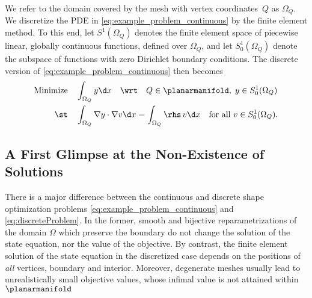 We refer to the domain covered by the mesh with vertex coordinates~$Q$ as $\Omega_Q$.
We discretize the PDE in \eqref{eq:example_problem_continuous} by the finite element method.
To this end, let $S^1(\Omega_Q)$ denotes the finite element space of piecewise linear, globally continuous functions, defined over $\Omega_Q$, and let $S^1_0(\Omega_Q)$ denote the subspace of functions with zero Dirichlet boundary conditions.
The discrete version of \eqref{eq:example_problem_continuous} then becomes
\begin{equation}
	\label{eq:discreteProblem}
	\begin{aligned}
		\text{Minimize}
		&
		\quad
		\int_{\Omega_Q} y \d x
		\quad
		\text{\wrt}
		\quad
		Q \in \planarmanifold
		,
		\;
		y \in S^1_0(\Omega_Q)
		\\
		\text{\st}
		&
		\quad
		\int_{\Omega_Q} \nabla y \cdot \nabla v \d x
		=
		\int_{\Omega_Q} \rhs \, v \d x
		\quad
		\text{for all }
		v \in S^1_0(\Omega_Q)
		.
	\end{aligned}
\end{equation}


\subsection{A First Glimpse at the Non-Existence of Solutions}
\label{subsection:first_glimpse_non-existence}

There is a major difference between the continuous and discrete shape optimization problems \eqref{eq:example_problem_continuous} and \eqref{eq:discreteProblem}.
In the former, smooth and bijective re\-pa\-ra\-metri\-za\-tions of the domain $\Omega$ which preserve the boundary do not change the solution of the state equation, nor the value of the objective.
By contrast, the finite element solution of the state equation in the discretized case depends on the positions of \emph{all} vertices, boundary and interior.
Moreover, degenerate meshes usually lead to unrealistically small objective values, whose infimal value is not attained within $\planarmanifold$

